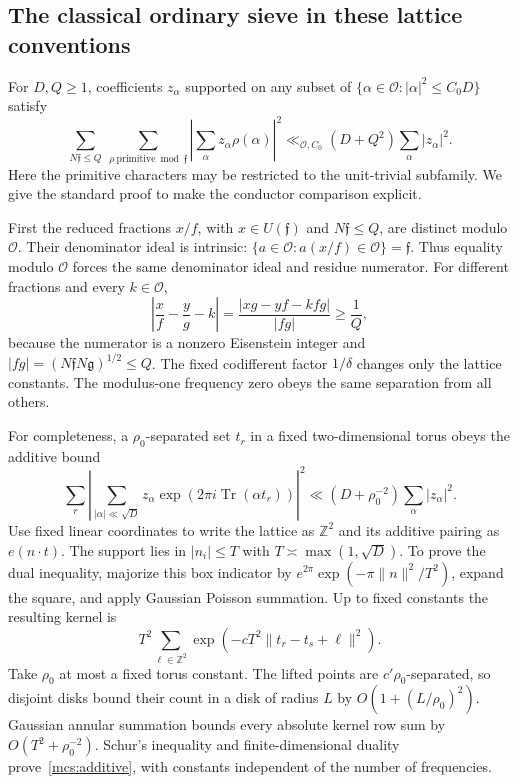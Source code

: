 \documentclass[11pt,oneside,openany]{book}
\theoremstyle{definition}\newtheorem{definition}[theorem]{Definition}
\theoremstyle{remark}\newtheorem{remark}[theorem]{Remark}
\begin{document}
\subsection{The classical ordinary sieve in these lattice conventions}
For $D,Q\ge1$, coefficients $z_\alpha$ supported on any subset of
$\{\alpha\in\mathcal O:|\alpha|^2\le C_0D\}$ satisfy
\begin{equation}\label{mcs:ordinary}
 \sum_{N\mathfrak f\le Q}\ \sum_{\rho\ \mathrm{primitive}\bmod\mathfrak f}
 \left|\sum_\alpha z_\alpha\rho(\alpha)\right|^2
 \ll_{\mathcal O,C_0}(D+Q^2)\sum_\alpha|z_\alpha|^2.
\end{equation}
Here the primitive characters may be restricted to the unit-trivial
subfamily. We give the standard proof to make the conductor comparison
explicit.

First the reduced fractions $x/f$, with $x\in U(\mathfrak f)$ and
$N\mathfrak f\le Q$, are distinct modulo $\mathcal O$.
Their denominator ideal is intrinsic:
$\{a\in\mathcal O:a(x/f)\in\mathcal O\}=\mathfrak f$.
Thus equality modulo $\mathcal O$ forces the same denominator ideal
and residue numerator. For different fractions and every $k\in\mathcal O$,
\[
 \left|\frac{x}{f}-\frac{y}{g}-k\right|
   =\frac{|xg-yf-kfg|}{|fg|}\ge\frac1Q,
\]
because the numerator is a nonzero Eisenstein integer and
$|fg|=(N\mathfrak f N\mathfrak g)^{1/2}\le Q$.
The fixed codifferent factor $1/\delta$ changes only the lattice constants.
The modulus-one frequency zero obeys the same separation from all others.

For completeness, a $\rho_0$-separated set $t_r$ in a fixed
two-dimensional torus obeys the additive bound
\begin{equation}\label{mcs:additive}
 \sum_r\left|\sum_{|\alpha|\ll\sqrt D}
        z_\alpha\exp(2\pi i\operatorname{Tr}(\alpha t_r))\right|^2
       \ll(D+\rho_0^{-2})\sum_\alpha|z_\alpha|^2.
\end{equation}
Use fixed linear coordinates to write the lattice as $\mathbb Z^2$ and
its additive pairing as $e(n\cdot t)$. The support lies in
$|n_i|\le T$ with $T\asymp\max(1,\sqrt D)$.
To prove the dual inequality, majorize this box indicator by
$e^{2\pi}\exp(-\pi\|n\|^2/T^2)$, expand the square, and apply Gaussian
Poisson summation. Up to fixed constants the resulting kernel is
\[
 T^2\sum_{\ell\in\mathbb Z^2}
       \exp(-cT^2\|t_r-t_s+\ell\|^2).
\]
Take $\rho_0$ at most a fixed torus constant. The lifted points are
$c'\rho_0$-separated, so disjoint disks bound their count in a disk
of radius $L$ by $O(1+(L/\rho_0)^2)$.
Gaussian annular summation bounds every absolute kernel row sum by
$O(T^2+\rho_0^{-2})$. Schur's inequality and finite-dimensional duality
prove~\eqref{mcs:additive}, with constants independent of the number
of frequencies.
\end{document}
